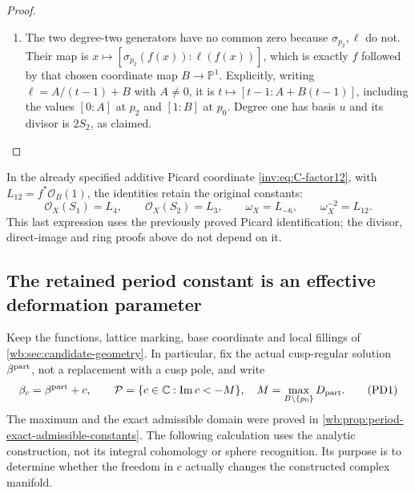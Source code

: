 \begin{proof}
\begin{enumerate}[label=\arabic*.,leftmargin=*]
\item The two degree-two generators have no common zero because
$\sigma_{p_2},\ell$ do not. Their map is
$x\mapsto[\sigma_{p_2}(f(x)):\ell(f(x))]$, which is exactly
$f$ followed by that chosen coordinate map $B\to\mathbb P^1$.
Explicitly, writing $\ell=A/(t-1)+B$ with $A\ne0$, it is
$t\mapsto[t-1:A+B(t-1)]$, including the values $[0:A]$ at $p_2$
and $[1:B]$ at $p_0$.
Degree one has basis $u$ and its divisor is $2S_2$, as claimed.
\end{enumerate}
\end{proof}

In the already specified additive Picard coordinate \eqref{inv:eq:C-factor12}, with
$L_{12}=f^*\mathcal O_B(1)$, the identities retain the original constants:
\[
 \mathcal O_X(S_1)=L_4,\qquad
 \mathcal O_X(S_2)=L_3,\qquad
 \omega_X=L_{-6},\qquad \omega_X^{-2}=L_{12}.
\]
This last expression uses the previously proved Picard identification;
the divisor, direct-image and ring proofs above do not depend on it.


\subsection{The retained period constant is an effective deformation parameter}
\label{wb:sec:retained-period-deformation}

Keep the functions, lattice marking, base coordinate and local fillings of
\cref{wb:sec:candidate-geometry}. In particular, fix the actual cusp-regular
solution $\beta^{\rm part}$, not a replacement with a cusp pole, and write
\[
 \beta_c=\beta^{\rm part}+c,\qquad
 \mathcal P=\{c\in\mathbb C:\operatorname{Im}c<-M\},
 \quad M=\max_{B\setminus\{p_0\}}D_{\rm part}.
 \tag{PD1}
\]
The maximum and the exact admissible domain were proved in
\cref{wb:prop:period-exact-admissible-constants}. The following calculation
uses the analytic construction, not its integral cohomology or sphere
recognition. Its purpose is to determine whether the freedom in $c$
actually changes the constructed complex manifold.

